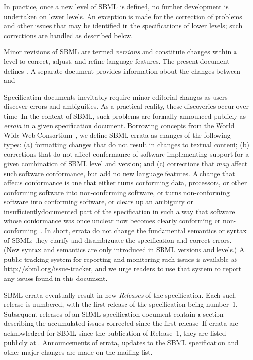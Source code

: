 In practice, once a new level of SBML is defined, no further
development is undertaken on lower levels.  An exception is made
for the correction of problems and other issues that may be
identified in the specifications of lower levels; such corrections
are handled as described below.

Minor revisions of SBML are termed \emph{versions} and constitute
changes within a level to correct, adjust, and refine language
features.  The present document defines \thisL \emph{\thisV}.  A separate
document provides information about the changes between \sbmlthree
and \sbmltwo.

Specification documents inevitably require minor editorial changes
as  users discover errors and ambiguities.  As a practical
reality, these discoveries occur over time.  In the context of
SBML, such problems are formally announced publicly as
\emph{errata} in a given specification document.  Borrowing
concepts from the World Wide Web Consortium~\citep{jacobs:2004},
we define SBML errata as changes of the following types: (a)
formatting changes that do not result in changes to textual
content; (b) corrections that do not affect conformance of
software implementing support for a given combination of SBML
level and version; and (c) corrections that \emph{may} affect such
software conformance, but add no new language features.  A change
that affects conformance is one that either turns conforming data,
processors, or other conforming software into non-conforming
software, or turns non-conforming software into conforming
software, or clears up an ambiguity or insufficiently\changed{-}documented
part of the specification in such a way that software whose
conformance was once unclear now becomes clearly conforming or
non-conforming~\citep{jacobs:2004}.  In short, errata do not
change the fundamental semantics or syntax of SBML; they clarify
and disambiguate the specification and correct errors.  (New
syntax and semantics are only introduced in SBML versions and
levels.)  A public tracking system for reporting and
monitoring such issues is available at
\url{http://sbml.org/issue-tracker}, and we urge readers to use
that system to report any issues found in this document.

SBML errata eventually result in new \emph{Releases} of the
specification.  Each such release is numbered, with the first
release of the specification being number~1.  Subsequent releases
of an SBML specification document contain a section describing the
accumulated issues corrected since the first release.  If errata
are acknowledged for SBML \thisLV since the publication of
Release~1, they are listed publicly at
.
Announcements of errata, updates to the SBML specification and
other major changes are made on the
 mailing
list.


